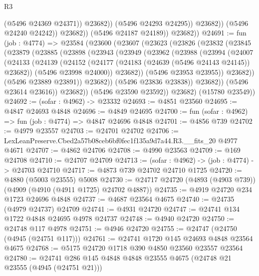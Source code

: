 \begin{lexlean}{R3}
\begin{coremodule}
                            (@5496 @24369 @24371))
                          @23682))
                      (@5496 @24293 @24295))
                    @23682))
                (@5496 @24240 @24242))
              @23682))
          (@5496 @24187 @24189))
        @23682))
@24691 := fun (job : @4774) =>
  @23584
    (@23600
      (@23607
        (@23623
          (@23826
            (@23832
              (@23845
                (@23879
                  (@23885
                    (@23898
                      (@23943
                        (@23949
                          (@23962
                            (@23988
                              (@23994
                                (@24007
                                  (@24133
                                    (@24139
                                      (@24152
                                        (@24177 (@24183 (@24639 (@5496 @24143 @24145)) @23682))
                                        (@5496 @23998 @24000))
                                      @23682))
                                  (@5496 @23953 @23955))
                                @23682))
                            (@5496 @23889 @23891))
                          @23682))
                      (@5496 @23836 @23838))
                    @23682))
                (@5496 @23614 @23616))
              @23682))
          (@5496 @23590 @23592))
        @23682)
      (@15780 @23549))
@24692 := (sofar : @4962) -> @23332
@24693 := @4851 @23560
@24695 := @4847 @24693 @4848
@24696 := @4849 @24695
@24700 := fun (sofar : @4962) => fun (job : @4774) => @4847 @24696 @4848
@24701 := @4856 @739
@24702 := @4979 @23557
@24703 := @24701 @24702
@24706 := LexLeanPreserve.Cbed2a57b08ceb6bf0fec1f135a9d7a44.R3.__fits_20 @4977 @4671
@24707 := @4862 @24706
@24708 := @4990 @23563
@24709 := @169 @24708
@24710 := @24707 @24709
@24713 := (sofar : @4962) -> (job : @4774) -> @24703 @24710
@24717 := @4873 @739 @24702 @24710 @1725
@24720 := @4880 (@5003 @23555) @5008
@24730 := @24717 @24720 (@4893 (@4903 @739)) (@4909 (@4910 (@4911 @1725) @24702 @4887))
@24735 := @4919 @24720 @234 @1723 @24696 @4848
@24737 := @4687 @23564 @4675
@24740 := @24735 (@4979 @24737) @24709
@24741 := @4931 @24720
@24747 := @24741 @134 @1722 @4848 @24695 @4978 @24737
@24748 := @4940 @24720
@24750 := @24748 @117 @4978
@24751 := @4946 @24720
@24755 := @24747 (@24750 (@4945 (@24751 @117)))
@24761 := @24741 @1720 @145 @24693 @4848 @23564 @4675
@24768 := @5175 @24720 @1718 @390 @4850 @23560 @23557 @23564
@24780 := @24741 @286 @145 @4848 @4848 @23555 @4675 (@24748 @21 @23555 (@4945 (@24751 @21)))

\end{coremodule}
\end{lexlean}
